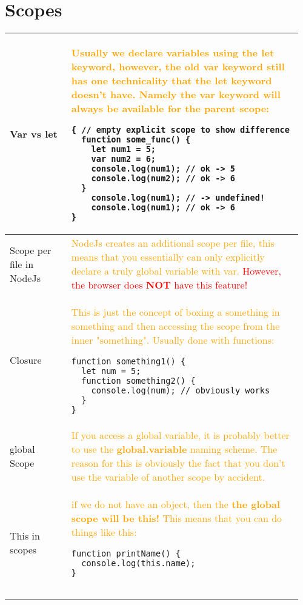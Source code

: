 \documentclass[main.tex,fontsize=8pt,paper=a4,paper=portrait,DIV=calc,]{scrartcl}
\begin{document}
\pagebreak
\begin{table}[ht!]
\section{Scopes}
\begin{tabular}{|m{0.2\linewidth}|m{0.755\linewidth}|}
\hline
Var vs let & 
\textcolor{orange}{Usually we declare variables using the let keyword, however, the old var keyword still has one technicality that the let keyword doesn't have. Namely the var keyword will always be available for the parent scope:}\newline
\begin{lstlisting}
{ // empty explicit scope to show difference
  function some_func() {
    let num1 = 5;
    var num2 = 6;
    console.log(num1); // ok -> 5
    console.log(num2); // ok -> 6
  }
    console.log(num1); // -> undefined!
    console.log(num1); // ok -> 6
}
\end{lstlisting}\\
\hline
Scope per file in NodeJs &
\textcolor{orange}{NodeJs creates an additional scope per file, this means that you essentially can only explicitly declare a truly global variable with var.}\newline
\textcolor{red}{However, the browser does \textbf{NOT} have this feature!}\\
\hline
Closure & 
\textcolor{orange}{This is just the concept of boxing a something in something and then accessing the scope from the inner "something". Usually done with functions:}\newline
\begin{lstlisting}
function something1() {
  let num = 5;
  function something2() {
    console.log(num); // obviously works
  }
}
\end{lstlisting}\\
\hline
global Scope & 
\textcolor{orange}{If you access a global variable, it is probably better to use the \textbf{global.variable} naming scheme. The reason for this is obviously the fact that you don't use the variable of another scope by accident.}\\
\hline
This in scopes & 
\textcolor{orange}{if we do not have an object, then the \textbf{the global scope will be this!}\newline
This means that you can do things like this:}\newline
\begin{lstlisting}
function printName() {
  console.log(this.name);
}


\end{lstlisting}
\end{tabular}
\end{table}
\end{document}
